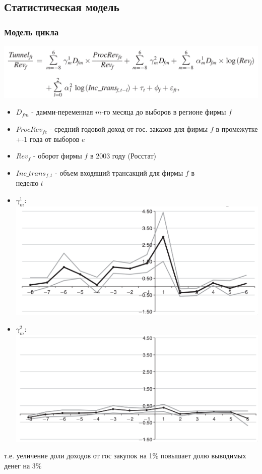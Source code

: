 \subsection{Статистическая модель}

\begin{frame}
\frametitle{Модель цикла}
\includegraphics[scale=0.18]{images/cycle2}
\begin{itemize}
	\item $D_{fm}$ - дамми-переменная $m$-го месяца до выборов в регионе фирмы $f$
	\item $ProcRev_{fe}$ - средний годовой доход от гос. заказов для фирмы $f$ в промежутке +-1 года от выборов $e$
	\item $Rev_{f}$ - оборот фирмы $f$ в 2003 году (Росстат)
	\item $Inc\_trans_{f,t}$ - объем входящий трансакций для фирмы $f$ в \\неделю $t$
\end{itemize}
\end{frame}

\begin{frame}
\begin{itemize}
	\item $\gamma^1_m$:\\
		\includegraphics[scale=0.18]{images/el_effect_gamma1}
	
	\item $\gamma^2_m$:\\
		\includegraphics[scale=0.18]{images/el_effect_gamma2}
\end{itemize}
т.е. уеличение доли доходов от гос закупок на 1\% повышает долю выводимых денег на 3\%
\end{frame}



